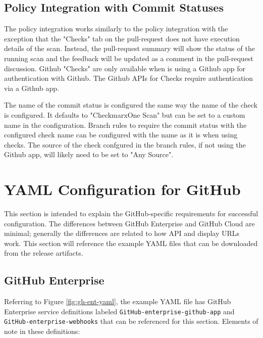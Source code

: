 \subsection{Policy Integration with Commit Statuses}
The 
policy integration works similarly to the  policy integration
with the exception that the "Checks" tab on the pull-request does not have execution details of the scan. Instead,
the pull-request summary will show the status of the running scan and the feedback will be updated as a
comment in the pull-request discussion.  Github "Checks" are only available when \cxoneflow is using
a Github app for authentication with Github.  The Github APIs for Checks require authentication via
a Github app.

The name of the commit status is configured the same way the name of the check is configured.  It defaults to
"CheckmarxOne Scan" but can be set to a custom name in the \cxoneflow configuration.  Branch rules to require
the commit status with the configured check name can be configured with the name as it is when using checks.
The source of the check confgured in the branch rules, if not using the Github app, will likely need
to be set to "Any Source".


\FloatBarrier

\section{\cxoneflowtext\space YAML Configuration for GitHub}\label{sec:gh-yaml-config}

This section is intended to explain the GitHub-specific requirements for successful configuration.  The differences
between GitHub Enterprise and GitHub Cloud are minimal; generally the differences are related to how API and display URLs
work.  This section will reference the example YAML files that can be downloaded from the \cxoneflow release artifacts.

\subsection{GitHub Enterprise}

Referring to Figure \ref{fig:gh-ent-yaml}, the example YAML file has GitHub Enterprise
service definitions labeled \texttt{GitHub-enterprise-github-app} and \texttt{GitHub-enterprise-webhooks}
that can be referenced for this section.  Elements of note in these definitions:

